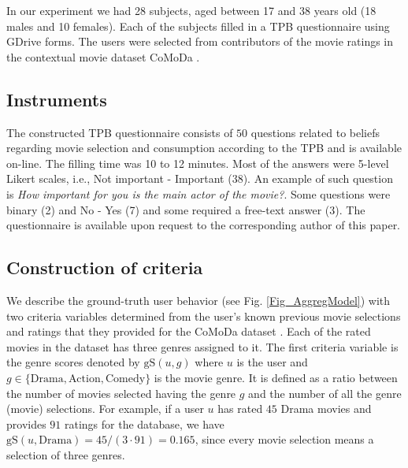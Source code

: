 \documentclass{llncs}
\def\gS{{\mbox{gS}}}
\begin{document}
In our experiment we had 28 subjects, aged between 17 and 38 years old (18 males and 10 females). Each of the subjects filled in a TPB questionnaire using GDrive forms. The users were selected from contributors of the movie ratings in the contextual movie dataset CoMoDa  \cite{CoMoDa2009}.


\subsection{Instruments}\label{SubSec_Instrum}

The constructed TPB questionnaire consists of $50$ questions related to beliefs regarding movie selection and consumption according to the TPB and is available on-line. The filling time was 10 to 12 minutes. Most of the answers were 5-level Likert scales, i.e., Not important - Important (38). An example of such question is {\it How important for you is the main actor of the movie?}. Some questions were binary (2) and No - Yes (7) and some required a free-text answer (3). The questionnaire is available upon request to the corresponding author of this paper. 


\subsection{Construction of criteria}\label{SubSec_CritConstr}

We describe the ground-truth user behavior (see Fig. \ref{Fig_AggregModel}) with two criteria variables determined from the user’s known previous movie selections and ratings that they provided for the CoMoDa dataset \cite{CoMoDa2009}. Each of the rated movies in the dataset has three genres assigned to it. The first criteria variable is the genre scores denoted by $\gS(u, g)$ where $u$ is the user and $g\in\{\mbox{Drama}, \mbox{Action}, \mbox{Comedy}\}$ is the movie genre. It is defined as a ratio between the number of movies selected having the genre $g$ and the number of all the genre (movie) selections. For example, if a user $u$ has rated $45$ Drama movies and provides $91$ ratings for the database, we have $\gS(u, \mbox{Drama}) = 45/(3\cdot91)=0.165$, since every movie selection means a selection of three genres. 
\end{document}
